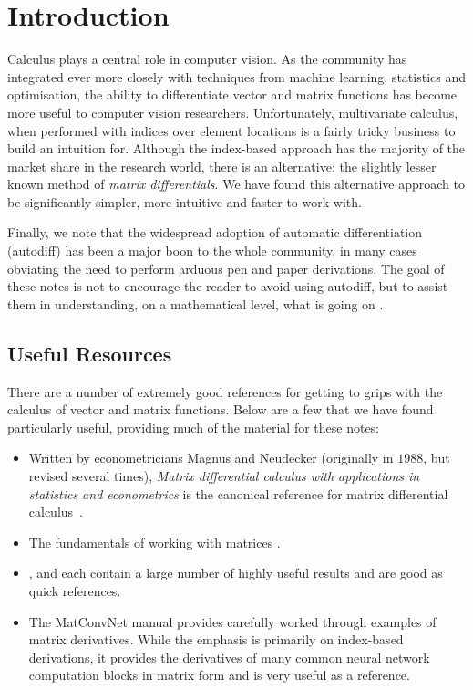 \chapter{Introduction}\label{sec:intro}

Calculus plays a central role in computer vision. As the community has integrated ever more closely with techniques from machine learning, statistics and optimisation, the ability to differentiate vector and matrix functions has become more useful to computer vision researchers.  Unfortunately, multivariate calculus, when performed with indices over element locations is a fairly tricky business to build an intuition for.  Although the index-based approach has the majority of the market share in the research world, there is an alternative: the slightly lesser known method of \textit{matrix differentials}.  We have found this alternative approach to be significantly simpler, more intuitive and faster to work with.  

Finally, we note that the widespread adoption of automatic differentiation (autodiff) has been a major boon to the whole community, in many cases obviating the need to perform arduous pen and paper derivations.  The goal of these notes is not to encourage the reader to avoid using autodiff, but to assist them in understanding, on a mathematical level, what is going on .


\section{Useful Resources}

There are a number of extremely good references for getting to grips with the calculus of vector and matrix functions.  Below are a few that we have found particularly useful, providing much of the material for these notes:

\begin{itemize}
\item Written by econometricians Magnus and Neudecker (originally in $1988$, but revised several times), \textit{Matrix differential calculus with applications in statistics and econometrics} is the canonical reference for matrix differential calculus~\cite{magnus1988matrix}.
\item The fundamentals of working with matrices \cite{searle2017matrix}.
\item \cite{kinghorn1996integrals}, \cite{minka2000old} and \cite{petersen2008matrix} each contain a large number of highly useful results and are good as quick references.
\item The MatConvNet manual \cite{vedaldi2015matconvnetmanual} provides carefully worked through examples of matrix derivatives.  While the emphasis is primarily on index-based derivations, it provides the derivatives of many common neural network computation blocks in matrix form and is very useful as a reference. 
\end{itemize}